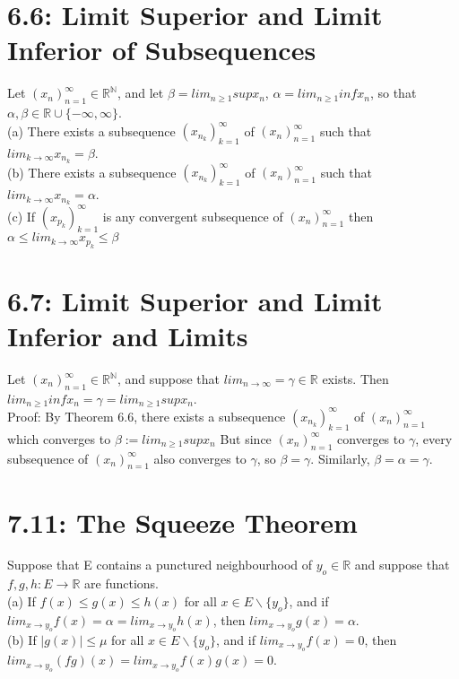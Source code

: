 \documentclass[10pt,letter]{report}
\begin{document}
\section*{6.6: Limit Superior and Limit Inferior of Subsequences}
Let $(x_n)_{n=1}^\infty\in\mathbb{R}^\mathbb{N}$, and let $\beta = lim_{n\geq 1}sup x_n$, $\alpha = lim_{n\geq 1}inf x_n$, so that $\alpha, \beta \in \mathbb{R}\cup \{-\infty, \infty\}$. \\ 
(a) There exists a subsequence $(x_{n_k})_{k=1}^\infty$ of $(x_n)_{n=1}^\infty$ such that $lim_{k\rightarrow\infty}x_{n_k} = \beta$. \\ 
(b) There exists a subsequence $(x_{n_k})_{k=1}^\infty$ of $(x_n)_{n=1}^\infty$ such that $lim_{k\rightarrow\infty}x_{n_k} = \alpha$. \\ 
(c) If $(x_{p_k})_{k=1}^\infty$ is any convergent subsequence of $(x_n)_{n=1}^\infty$ then $\alpha\leq lim_{k\rightarrow\infty}x_{p_k}\leq\beta$

\section*{6.7: Limit Superior and Limit Inferior and Limits}
Let $(x_n)_{n=1}^\infty \in \mathbb{R}^\mathbb{N}$, and suppose that $lim_{n\rightarrow\infty} = \gamma \in \mathbb{R}$ exists. Then $lim_{n\geq 1}inf x_n = \gamma = lim_{n\geq 1}sup x_n$.\\ 
Proof: By Theorem 6.6, there exists a subsequence $(x_{n_k})_{k=1}^\infty$ of $(x_n)_{n=1}^\infty$ which converges to $\beta:= lim_{n\geq 1}supx_n$ But since $(x_n)_{n=1}^\infty$ converges to $\gamma$, every subsequence of $(x_n)_{n=1}^\infty$ also converges to $\gamma$, so $\beta = \gamma$. Similarly, $\beta = \alpha = \gamma$. 

\section*{7.11: The Squeeze Theorem}
Suppose that E contains a punctured neighbourhood of $y_o\in\mathbb{R}$ and suppose that $f, g, h: E\rightarrow\mathbb{R}$ are functions. \\ 
(a) If $f(x)\leq g(x)\leq h(x)$ for all $x\in E\backslash\{y_o\}$, and if $lim_{x\rightarrow y_o}f(x) = \alpha = lim_{x\rightarrow y_o}h(x)$, then $lim_{x\rightarrow y_o}g(x) = \alpha$. \\ 
(b) If $|g(x)|\leq \mu$ for all $x \in E\backslash\{y_o\}$, and if $lim_{x\rightarrow y_o}f(x) = 0$, then $lim_{x\rightarrow y_o}(fg)(x) =lim_{x\rightarrow y_o}f(x)g(x) = 0$.
\end{document}
